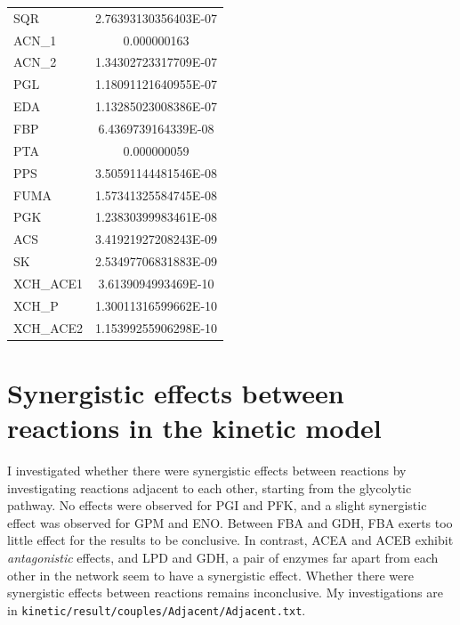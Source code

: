 \documentclass[parskip=full, numbers=noenddot]{scrreprt}
\begin{document}
\begin{longtable}{lS}
SQR & 2.76393130356403E-07\\
ACN\_1 & 0.000000163\\
ACN\_2 & 1.34302723317709E-07\\
PGL & 1.18091121640955E-07\\
EDA & 1.13285023008386E-07\\
FBP & 6.4369739164339E-08\\
PTA & 0.000000059\\
PPS & 3.50591144481546E-08\\
FUMA & 1.57341325584745E-08\\
PGK & 1.23830399983461E-08\\
ACS & 3.41921927208243E-09\\
SK & 2.53497706831883E-09\\
XCH\_ACE1 & 3.6139094993469E-10\\
XCH\_P & 1.30011316599662E-10\\
XCH\_ACE2 & 1.15399255906298E-10\\
\bottomrule
\end{longtable}

\section{Synergistic effects between reactions in the kinetic model}
\label{ap:synergistic}

I investigated whether there were synergistic effects between reactions by investigating reactions adjacent to each other, starting from the glycolytic pathway. No effects were observed for PGI and PFK, and a slight synergistic effect was observed for GPM and ENO. Between FBA and GDH, FBA exerts too little effect for the results to be conclusive. In contrast, ACEA and ACEB exhibit \emph{antagonistic} effects, and LPD and GDH, a pair of enzymes far apart from each other in the network seem to have a synergistic effect. Whether there were synergistic effects between reactions remains inconclusive. My investigations are in \texttt{kinetic/result/couples/Adjacent/Adjacent.txt}.

\printbibliography
\end{document}
